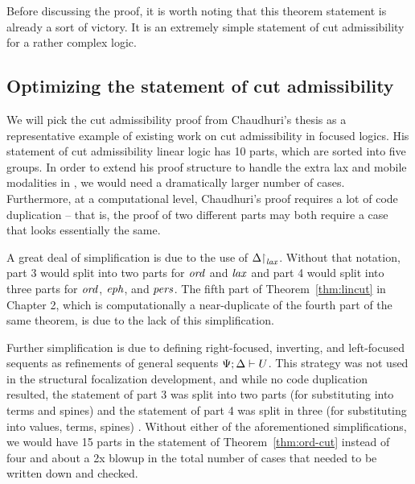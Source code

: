 Before discussing the proof, it is worth noting that this theorem
statement is already a sort of victory. It is an extremely simple
statement of cut admissibility for a rather complex logic.

\subsection{Optimizing the statement of cut admissibility}

We will pick the cut admissibility proof
from Chaudhuri's thesis \cite{chaudhuri06focused} as a representative
example of existing work on cut admissibility in focused logics.  His
statement of cut admissibility linear logic has 10 parts, 
which are sorted into
five groups. In order to extend his
proof structure to handle the extra lax and mobile modalities in
\ollll, we would need a dramatically larger number of
cases. Furthermore, at a computational level, Chaudhuri's proof
requires a lot of code duplication -- that is, the proof of two
different parts may both require a case that looks essentially the
same.

A great deal of simplification is due to the use of
${\Delta}{\upharpoonright}_{{\it lax}}$. Without that notation, part 3 would
split into two parts for ${\it ord}$ and ${\it lax}$ and part 4 would split
into three parts for ${\it ord}$, ${\it eph}$, and ${\it pers}$. The fifth part
of Theorem~\ref{thm:lincut} in Chapter 2, which is computationally a
near-duplicate of the fourth part of the same theorem, is due to the
lack of this simplification.

Further simplification is due to defining right-focused, inverting,
and left-focused sequents as refinements of general sequents
${\Psi};{\Delta} \vdash {U}$. This strategy was not used in the structural
focalization development, and while no code duplication resulted, the
statement of part 3 was split into two parts (for substituting into
terms and spines) and the statement of part 4 was split in three (for
substituting into values, terms, spines) \cite{simmons11structural}.
Without either of the aforementioned simplifications, we would have 15
parts in the statement of Theorem~\ref{thm:ord-cut} instead of four
and about a 2x blowup in the total number of cases that needed to be
written down and checked.

